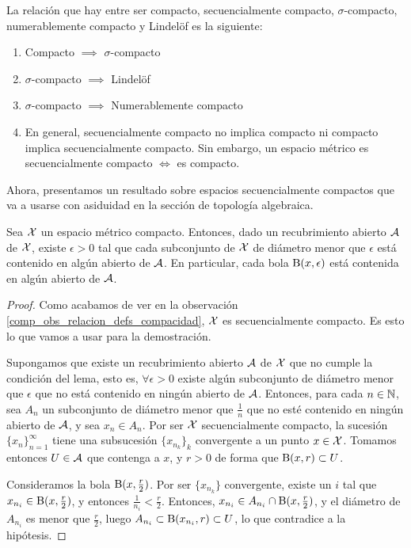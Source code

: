 \begin{obs}
	\label{comp_obs_relacion_defs_compacidad}
	La relación que hay entre ser compacto, secuencialmente compacto, $\sigma$-compacto, numerablemente compacto y Lindelöf es la siguiente:
	\begin{enumerate}
		\item Compacto $\implies$ $\sigma$-compacto
		\item $\sigma$-compacto $\implies$ Lindelöf
		\item $\sigma$-compacto $\implies$ Numerablemente compacto
		\item En general, secuencialmente compacto no implica compacto ni compacto implica secuencialmente compacto. Sin embargo, un espacio métrico es secuencialmente compacto $\iff$ es compacto. \qedhere
	\end{enumerate}
\end{obs}

Ahora, presentamos un resultado sobre espacios secuencialmente compactos que va a usarse con asiduidad en la sección de topología algebraica.

\begin{lem}[Lebesgue]
	\label{comp_lema_lebesgue}
	Sea $\mathcal{X}$ un espacio métrico compacto. Entonces, dado un recubrimiento abierto $\mathcal{A}$ de $\mathcal{X}$, existe $\epsilon>0$ tal que cada subconjunto de $\mathcal{X}$ de diámetro menor que $\epsilon$ está contenido en algún abierto de $\mathcal{A}$. En particular, cada bola $\operatorname{B}(x,\epsilon)$ está contenida en algún abierto de $\mathcal{A}$.

	\begin{proof}
		Como acabamos de ver en la observación \ref{comp_obs_relacion_defs_compacidad}, $\mathcal{X}$ es secuencialmente compacto. Es esto lo que vamos a usar para la demostración.
	
		Supongamos que existe un recubrimiento abierto $\mathcal{A}$ de $\mathcal{X}$ que no cumple la condición del lema, esto es, $\forall\epsilon > 0$ existe algún subconjunto de diámetro menor que $\epsilon$ que no está contenido en ningún abierto de $\mathcal{A}$. Entonces, para cada $n\in\mathbb{N}$, sea $A_n$ un subconjunto de diámetro menor que $\frac{1}{n}$ que no esté contenido en ningún abierto de $\mathcal{A}$, y sea $x_n\in A_n$. Por ser $\mathcal{X}$ secuencialmente compacto, la sucesión $\{x_n\}_{n=1}^\infty$ tiene una subsucesión $\{x_{n_k}\}_k$ convergente a un punto $x\in\mathcal{X}$. Tomamos entonces $U\in\mathcal{A}$ que contenga a $x$, y $r>0$ de forma que $\operatorname{B}(x,r)\subset U$.

		Consideramos la bola $\operatorname{B}(x,\frac{r}{2})$. Por ser $\{x_{n_k}\}$ convergente, existe un $i$ tal que $x_{n_i}\in\operatorname{B}(x,\frac{r}{2})$, y entonces $\frac{1}{n_i}<\frac{r}{2}$. Entonces, $x_{n_i}\in A_{n_i}\cap\operatorname{B}(x,\frac{r}{2})$, y el diámetro de $A_{n_i}$ es menor que $\frac{r}{2}$, luego $A_{n_i}\subset\operatorname{B}(x_{n_i},r)\subset U$, lo que contradice a la hipótesis.
	\end{proof}
\end{lem}

